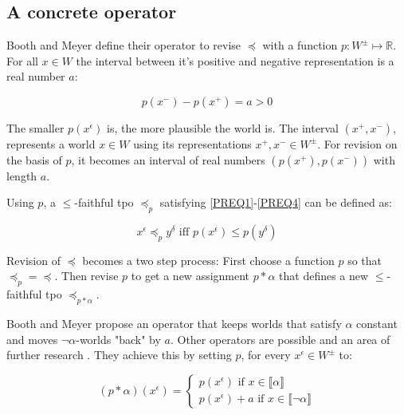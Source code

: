 \documentclass[english, 12pt]{scrartcl}
\theoremstyle{definition}
\theoremstyle{definition}
\theoremstyle{definition}
\newcommand{\modelsOf}[1]{\llbracket #1 \rrbracket}
\begin{document}
\subsection{A concrete operator}
Booth and Meyer define their operator to revise $\preceq$ with a function $p: W^{\pm} \mapsto \mathds{R}$. For all $x \in W$ the interval between it's positive and negative representation is a real number $a$:

\begin{equation*}
    p(x^{-}) - p(x^{+}) = a > 0
\end{equation*}

The smaller $p(x^{\epsilon})$ is, the more plausible the world is. The interval $(x^{+}, x^{-})$, represents a world $x \in W$ using its representations $x^{+}, x^{-} \in W^{\pm}$. For revision on the basis of $p$, it becomes an interval of real numbers $(p(x^{+}), p(x^{-}))$ with length $a$.

\bigskip

Using $p$, a $\leq$-faithful tpo $\preceq_{p}$ satisfying \ref{PREQ1}-\ref{PREQ4} can be defined as:

\begin{equation*}
    x^{\epsilon} \preceq_{p} y^{\delta} \textrm{ iff } p(x^{\epsilon}) \leq p(y^{\delta} )
\end{equation*}

\bigskip

Revision of $\preceq$ becomes a two step process: First choose a function $p$ so that $\preceq_{p} = \preceq$. Then revise $p$ to get a new assignment $p \ast \alpha$ that defines a new $\leq$-faithful tpo $\preceq_{p \ast \alpha}$.

Booth and Meyer propose an operator that keeps worlds that satisfy $\alpha$ constant and moves $\neg\alpha$-worlds "back" by $a$. Other operators are possible and an area of further research \cite{Booth2011}. They achieve this by setting $p$, for every $x^{\epsilon} \in W^{\pm}$ to:
    
\begin{equation*}
    (p \ast \alpha)(x^{\epsilon}) = \left\{
                    \begin{array}{ll}
                      p(x^{\epsilon}) \textrm{ if } x \in \modelsOf{\alpha}\\
                      p(x^{\epsilon}) + a \textrm{ if } x \in \modelsOf{\neg\alpha}
                    \end{array}
                  \right.
\end{equation*}
\end{document}
